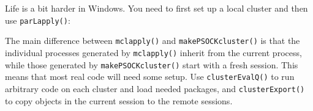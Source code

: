 \begin{Shaded}
\begin{Highlighting}[]
\end{Highlighting}
\end{Shaded}

\begin{Shaded}
\begin{Highlighting}[]
\StringTok{ }\NormalTok{()}

\StringTok{ }
\NormalTok{\}}

\NormalTok{(}\NormalTok{(}\NormalTok{:}\NormalTok{, }\NormalTok{(}\NormalTok{)))}
\NormalTok{(}\NormalTok{(}\NormalTok{:}\NormalTok{, }\NormalTok{(}\NormalTok{), } 
\end{Highlighting}
\end{Shaded}

Life is a bit harder in Windows. You need to first set up a local
cluster and then use \texttt{parLapply()}: 

\begin{Shaded}
\begin{Highlighting}[]
\StringTok{ }
\NormalTok{(}\NormalTok{:}\NormalTok{(}\NormalTok{)))}
\end{Highlighting}
\end{Shaded}

The main difference between \texttt{mclapply()} and
\texttt{makePSOCKcluster()} is that the individual processes generated
by \texttt{mclapply()} inherit from the current process, while those
generated by \texttt{makePSOCKcluster()} start with a fresh session.
This means that most real code will need some setup. Use
\texttt{clusterEvalQ()} to run arbitrary code on each cluster and load
needed packages, and \texttt{clusterExport()} to copy objects in the
current session to the remote sessions.

